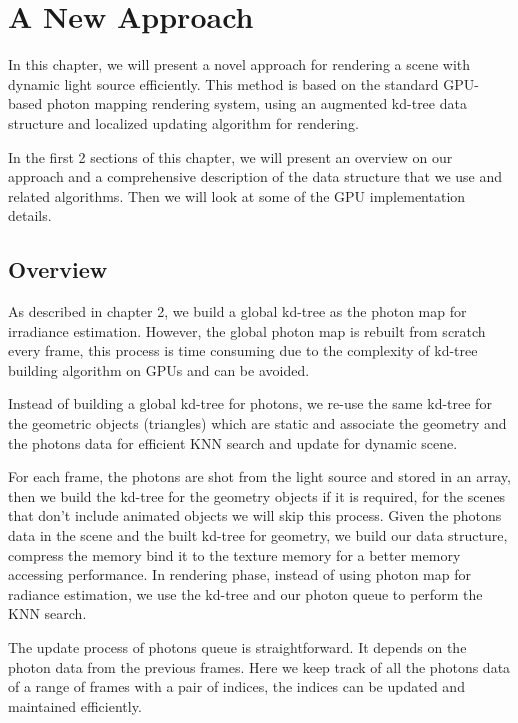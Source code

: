 \chapter{A New Approach}

In this chapter, we will present a novel approach for rendering a scene with dynamic light source efficiently. This method is based on the standard GPU-based photon mapping rendering system, using an augmented kd-tree data structure and localized updating algorithm for rendering.

In the first 2 sections of this chapter, we will present an overview on our approach and a comprehensive description of the data structure that we use and related algorithms. Then we will look at some of the GPU implementation details.

\section{Overview}

As described in chapter 2, we build a global kd-tree as the photon map for irradiance estimation. However, the global photon map is rebuilt from scratch every frame, this process is time consuming due to the complexity of kd-tree building algorithm on GPUs and can be avoided.

Instead of building a global kd-tree for photons, we re-use the same kd-tree for the geometric objects (triangles) which are static and associate the geometry and the photons data for efficient KNN search and update for dynamic scene.

For each frame, the photons are shot from the light source and stored in an array, then we build the kd-tree for the geometry objects if it is required, for the scenes that don't include animated objects we will skip this process. Given the photons data in the scene and the built kd-tree for geometry, we build our data structure, compress the memory bind it to the texture memory for a better memory accessing performance. 
In rendering phase, instead of using photon map for radiance estimation, we use the kd-tree and our photon queue to perform the KNN search.

The update process of photons queue is straightforward. It depends on the photon data from the previous frames. Here we keep track of all the photons data of a range of frames with a pair of indices, the indices can be updated and maintained efficiently. 

